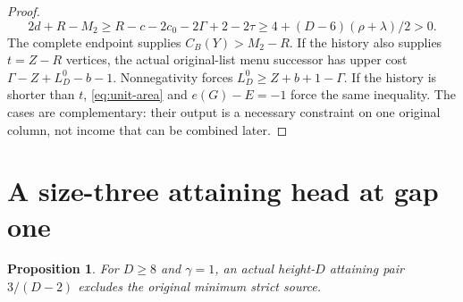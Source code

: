 \documentclass[11pt,a4paper]{article}
\newtheorem{proposition}[theorem]{Proposition}
\theoremstyle{definition}
\begin{document}
\begin{proof}
\[
2d+R-M_2\ge R-c-2c_0-2\Gamma+2-2\tau
\ge4+(D-6)(\rho+\lambda)/2>0.
\]
The complete endpoint supplies $C_B(Y)>M_2-R$.
If the history also supplies $t=Z-R$ vertices, the actual original-list menu successor
has upper cost $\Gamma-Z+L_D^0-b-1$.
Nonnegativity forces $L_D^0\ge Z+b+1-\Gamma$.
If the history is shorter than $t$, \eqref{eq:unit-area} and $e(G)-E=-1$
force the same inequality.
The cases are complementary: their output is a necessary constraint on one
original column, not income that can be combined later.
\end{proof}

\section{A size-three attaining head at gap one}\label{app:gap1-three}
\begin{proposition}\label{prop:gap1-three}
For $D\ge8$ and $\gamma=1$, an actual height-$D$ attaining pair $3/(D-2)$
excludes the original minimum strict source.
\end{proposition}
\end{document}
